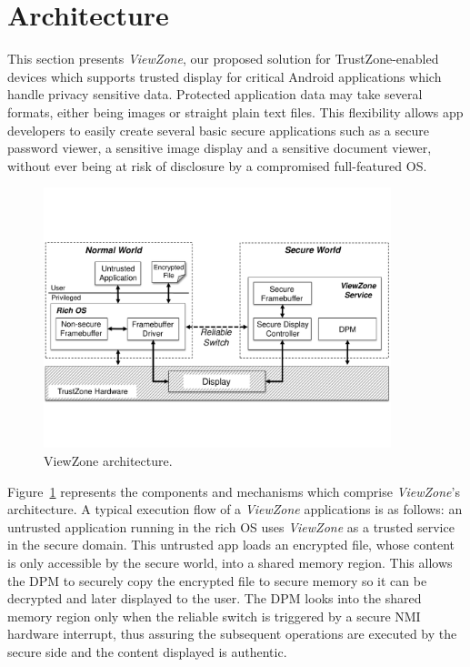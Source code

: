 
% 
% 
\section{Architecture}
\label{sec:architecture}

This section presents \emph{ViewZone}, our proposed solution for TrustZone-enabled devices which supports trusted display for critical Android applications which handle privacy sensitive data. Protected application data may take several formats, either being images or straight plain text files. This flexibility allows app developers to easily create several basic secure applications such as a secure password viewer, a sensitive image display and a sensitive document viewer, without ever being at risk of disclosure by a compromised full-featured OS.

\begin{figure}[t!]
	\centering
	\includegraphics[width=0.9\textwidth]{img/viewzone_architecture.pdf}
	\caption{ViewZone architecture.}
	\label{fig:viewzone_architecture}
\end{figure}

Figure~\ref{fig:viewzone_architecture} represents the components and mechanisms which comprise \emph{ViewZone}'s architecture. A typical execution flow of a \emph{ViewZone} applications is as follows: an untrusted application running in the rich OS uses \emph{ViewZone} as a trusted service in the secure domain. This untrusted app loads an encrypted file, whose content is only accessible by the secure world, into a shared memory region. This allows the \ac{DPM} to securely copy the encrypted file to secure memory so it can be decrypted and later displayed to the user. The \ac{DPM} looks into the shared memory region only when the reliable switch is triggered by a secure \ac{NMI} hardware interrupt, thus assuring the subsequent operations are executed by the secure side and the content displayed is authentic.

